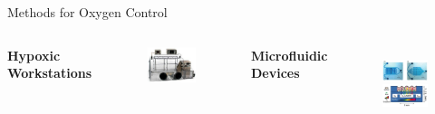 \documentclass{beamer}
\begin{document}
\begin{frame}{Methods for Oxygen Control}
\begin{columns}[c] %
\textbf{Hypoxic Workstations}
\begin{figure}
\includegraphics[width=0.8\linewidth]{images/hypoxia-workstation.png}
 \end{figure}
\textbf{Microfluidic Devices}
\begin{figure}
\includegraphics[width=0.7\linewidth]{images/lo1.png}\\
\includegraphics[width=0.7\linewidth]{images/lo2.png}\\
\hspace*{11pt}\hbox{\scriptsize {}}
 \end{figure}
\end{columns}
\end{frame}
\end{document}
